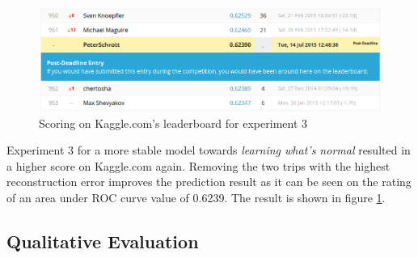\documentclass{vldb}
\begin{document}
\begin{figure}
\centering
\includegraphics[width=\linewidth]{"pics/kaggle-result-3"}
\caption{Scoring on Kaggle.com's leaderboard for experiment 3}
\label{fig:kaggle-result3}
\end{figure}
 
Experiment 3 for a more stable model towards \textit{learning what's normal} resulted in a higher score on Kaggle.com again. Removing the two trips with the highest reconstruction error improves the prediction result as it can be seen on the rating of an area under ROC curve value of 0.6239. The result is shown in figure \ref{fig:kaggle-result3}. 

\subsection{Qualitative Evaluation}
\label{subsec:Quali-eval}
\end{document}
